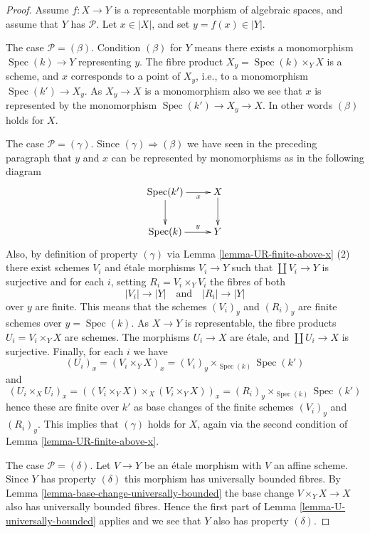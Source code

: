\documentclass{stacks-project}
\theoremstyle{plain}
\theoremstyle{definition}
\theoremstyle{remark}
\numberwithin{equation}{subsection}
\def\Spec{\mathop{\mathrm{Spec}}}
\begin{document}
\begin{proof}
Assume $f : X \to Y$ is a representable morphism of algebraic spaces,
and assume that $Y$ has $\mathcal{P}$. Let $x \in |X|$, and set
$y = f(x) \in |Y|$.

\medskip\noindent
The case $\mathcal{P} = (\beta)$. Condition $(\beta)$ for $Y$ means
there exists a monomorphism $\Spec(k) \to Y$ representing $y$.
The fibre product $X_y = \Spec(k) \times_Y X$ is a scheme, and
$x$ corresponds to a point of $X_y$, i.e., to a monomorphism
$\Spec(k') \to X_y$. As $X_y \to X$ is a monomorphism also we see
that $x$ is represented by the monomorphism $\Spec(k') \to X_y \to X$.
In other words $(\beta)$ holds for $X$.

\medskip\noindent
The case $\mathcal{P} = (\gamma)$. Since $(\gamma) \Rightarrow (\beta)$
we have seen in the preceding paragraph that $y$ and $x$ can be represented
by monomorphisms as in the following diagram
$$
\xymatrix{
\Spec(k') \ar[r]_-x \ar[d] & X \ar[d] \\
\Spec(k) \ar[r]^-y & Y
}
$$
Also, by definition of property $(\gamma)$ via
Lemma \ref{lemma-UR-finite-above-x} (2)
there exist schemes
$V_i$ and \'etale morphisms $V_i \to Y$ such that $\coprod V_i \to Y$
is surjective and for each $i$, setting $R_i = V_i \times_Y V_i$
the fibres of both
$$
|V_i| \longrightarrow |Y|
\quad\text{and}\quad
|R_i| \longrightarrow |Y|
$$
over $y$ are finite. This means that the schemes
$(V_i)_y$ and $(R_i)_y$ are finite schemes over $y = \Spec(k)$.
As $X \to Y$ is representable, the fibre products $U_i = V_i \times_Y X$
are schemes. The morphisms $U_i \to X$ are \'etale, and
$\coprod U_i \to X$ is surjective. Finally, for each $i$ we have
$$
(U_i)_x =
(V_i \times_Y X)_x =
(V_i)_y \times_{\Spec(k)} \Spec(k')
$$
and
$$
(U_i \times_X U_i)_x =
\left((V_i \times_Y X) \times_X (V_i \times_Y X)\right)_x =
(R_i)_y \times_{\Spec(k)} \Spec(k')
$$
hence these are finite over $k'$ as base changes of the finite
schemes $(V_i)_y$ and $(R_i)_y$. This implies that $(\gamma)$ holds for $X$,
again via the second condition of
Lemma \ref{lemma-UR-finite-above-x}.

\medskip\noindent
The case $\mathcal{P} = (\delta)$. Let $V \to Y$ be an \'etale morphism with
$V$ an affine scheme. Since $Y$ has property $(\delta)$ this morphism has
universally bounded fibres. By
Lemma \ref{lemma-base-change-universally-bounded}
the base change $V \times_Y X \to X$ also has universally bounded fibres.
Hence the first part of
Lemma \ref{lemma-U-universally-bounded}
applies and we see that $Y$ also has property $(\delta)$.


\end{proof}
\end{document}
